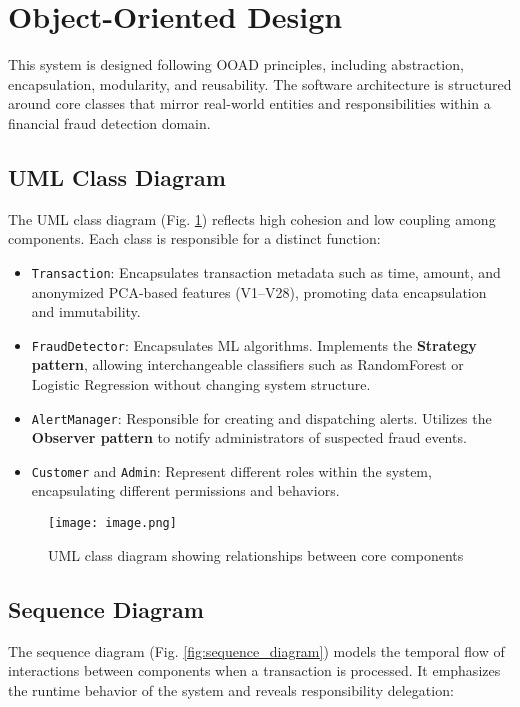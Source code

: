 \documentclass[12pt]{article}
\begin{document}
\section{Object-Oriented Design}

This system is designed following OOAD principles, including abstraction, encapsulation, modularity, and reusability. The software architecture is structured around core classes that mirror real-world entities and responsibilities within a financial fraud detection domain.

\subsection{UML Class Diagram}
The UML class diagram (Fig. \ref{fig:class_diagram}) reflects high cohesion and low coupling among components. Each class is responsible for a distinct function:

\begin{itemize}[leftmargin=*]
    \item \texttt{Transaction}: Encapsulates transaction metadata such as time, amount, and anonymized PCA-based features (V1–V28), promoting data encapsulation and immutability.
    \item \texttt{FraudDetector}: Encapsulates ML algorithms. Implements the \textbf{Strategy pattern}, allowing interchangeable classifiers such as RandomForest or Logistic Regression without changing system structure.
    \item \texttt{AlertManager}: Responsible for creating and dispatching alerts. Utilizes the \textbf{Observer pattern} to notify administrators of suspected fraud events.
    \item \texttt{Customer} and \texttt{Admin}: Represent different roles within the system, encapsulating different permissions and behaviors.
\end{itemize}

\begin{figure}[H]
\centering
\texttt{[image: image.png]}
\caption{UML class diagram showing relationships between core components}
\label{fig:class_diagram}
\end{figure}

\subsection{Sequence Diagram}
The sequence diagram (Fig. \ref{fig:sequence_diagram}) models the temporal flow of interactions between components when a transaction is processed. It emphasizes the runtime behavior of the system and reveals responsibility delegation:
\end{document}
